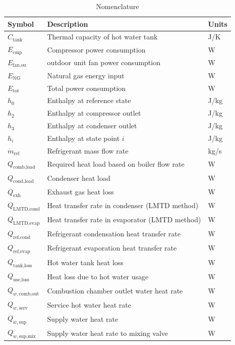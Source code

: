 \documentclass[final,5p,times,twocolumn,authoryear]{elsarticle}
\begin{document}
\begin{table}[t]
\centering
\caption{Nomenclature}
\label{tab:nomenclature}
\renewcommand{\arraystretch}{1.2}
\begin{tabularx}{\columnwidth}{l X l}
\toprule
\textbf{Symbol} & \textbf{Description} & \textbf{Units} \\
\midrule
$C_{\text{tank}}$ & Thermal capacity of hot water tank & J/K \\
$E_{\text{cmp}}$ & Compressor power consumption & W \\
$E_{\text{fan,ou}}$ & outdoor unit fan power consumption & W \\
$E_{\text{NG}}$ & Natural gas energy input & W \\
$E_{\text{tot}}$ & Total power consumption & W \\
$h_0$ & Enthalpy at reference state & J/kg \\
$h_2$ & Enthalpy at compressor outlet & J/kg \\
$h_3$ & Enthalpy at condenser outlet & J/kg \\
$h_i$ & Enthalpy at state point $i$ & J/kg \\
$\dot{m}_{\text{ref}}$ & Refrigerant mass flow rate & kg/s \\
$Q_{\text{comb,load}}$ & Required heat load based on boiler flow rate & W \\
$Q_{\text{cond,load}}$ & Condenser heat load & W \\
$Q_{\text{exh}}$ & Exhaust gas heat loss & W \\
$Q_{\text{LMTD,cond}}$ & Heat transfer rate in condenser (LMTD method) & W \\
$Q_{\text{LMTD,evap}}$ & Heat transfer rate in evaporator (LMTD method) & W \\
$Q_{\text{ref,cond}}$ & Refrigerant condensation heat transfer rate & W \\
$Q_{\text{ref,evap}}$ & Refrigerant evaporation heat transfer rate & W \\
$Q_{\text{tank,loss}}$ & Hot water tank heat loss & W \\
$Q_{\text{use,loss}}$ & Heat loss due to hot water usage & W \\
$Q_{w,\text{comb,out}}$ & Combustion chamber outlet water heat rate & W \\
$Q_{w,\text{serv}}$ & Service hot water heat rate & W \\
$Q_{w,\text{sup}}$ & Supply water heat rate & W \\
$Q_{w,\text{sup,mix}}$ & Supply water heat rate to mixing valve & W \\

\end{tabularx}
\end{table}
\end{document}
